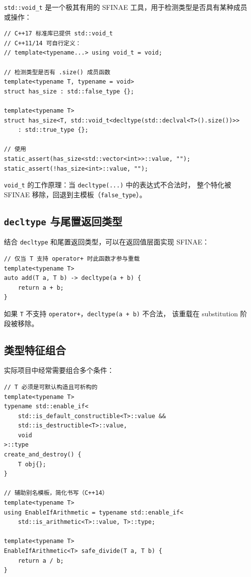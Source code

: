 \documentclass[12pt,a4paper,fontset=fandol]{ctexbook}
\begin{document}
\texttt{std::void\_t} 是一个极其有用的 SFINAE 工具，用于检测类型是否具有某种成员或操作：

\begin{lstlisting}
// C++17 标准库已提供 std::void_t
// C++11/14 可自行定义：
// template<typename...> using void_t = void;

// 检测类型是否有 .size() 成员函数
template<typename T, typename = void>
struct has_size : std::false_type {};

template<typename T>
struct has_size<T, std::void_t<decltype(std::declval<T>().size())>>
    : std::true_type {};

// 使用
static_assert(has_size<std::vector<int>>::value, "");
static_assert(!has_size<int>::value, "");
\end{lstlisting}

\texttt{void\_t} 的工作原理：当 \texttt{decltype(...)} 中的表达式不合法时，
整个特化被 SFINAE 移除，回退到主模板（\texttt{false\_type}）。

\subsection{\texttt{decltype} 与尾置返回类型}

结合 \texttt{decltype} 和尾置返回类型，可以在返回值层面实现 SFINAE：

\begin{lstlisting}
// 仅当 T 支持 operator+ 时此函数才参与重载
template<typename T>
auto add(T a, T b) -> decltype(a + b) {
    return a + b;
}
\end{lstlisting}

如果 \texttt{T} 不支持 \texttt{operator+}，\texttt{decltype(a + b)} 不合法，
该重载在 substitution 阶段被移除。

\subsection{类型特征组合}

实际项目中经常需要组合多个条件：

\begin{lstlisting}
// T 必须是可默认构造且可析构的
template<typename T>
typename std::enable_if<
    std::is_default_constructible<T>::value &&
    std::is_destructible<T>::value,
    void
>::type
create_and_destroy() {
    T obj{};
}

// 辅助别名模板，简化书写（C++14）
template<typename T>
using EnableIfArithmetic = typename std::enable_if<
    std::is_arithmetic<T>::value, T>::type;

template<typename T>
EnableIfArithmetic<T> safe_divide(T a, T b) {
    return a / b;
}
\end{lstlisting}
\end{document}
